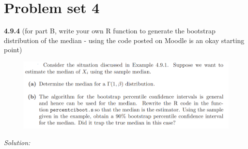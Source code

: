 \documentclass{book}
\theoremstyle{definition}
\begin{document}
\newpage























\section{Problem set 4}

\noindent\textbf{4.9.4} (for part B, write your own R function to generate the bootstrap distribution of the median -
using the code posted on Moodle is an okay starting point)

\begin{figure}[!htb]
	\centering
	\includegraphics[scale=0.5]{494}
\end{figure}



\noindent \textit{Solution:} 
\end{document}
